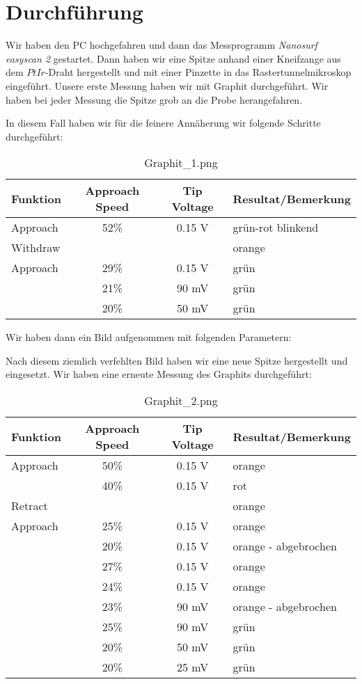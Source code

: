 \section{Durchführung}


Wir haben den PC hochgefahren und dann das Messprogramm \emph{Nanosurf easyscan 2} gestartet. Dann haben wir eine Spitze anhand einer Kneifzange aus dem $PtIr$-Draht hergestellt und mit einer Pinzette in das Rastertunnelmikroskop eingeführt. Unsere erste Messung haben wir mit Graphit durchgeführt. Wir haben bei jeder Messung die Spitze grob an die Probe herangefahren. 

In diesem Fall haben wir für die feinere Annäherung wir folgende Schritte durchgeführt:



\begin{table}[H]
\caption{Graphit\_1.png}
\centering \begin{tabular}[H]{l c c l}
Funktion & Approach Speed & Tip Voltage & Resultat/Bemerkung\\ \hline
Approach & 52\% & 0.15 V & grün-rot blinkend\\
Withdraw & & & orange\\
Approach & 29\% & 0.15 V & grün\\
 & 21\% & 90 mV & grün\\
 & 20\% & 50 mV & grün\\
\end{tabular}
\end{table}


Wir haben dann ein Bild aufgenommen mit folgenden Parametern:



Nach diesem ziemlich verfehlten Bild haben wir eine neue Spitze hergestellt und eingesetzt. Wir haben eine erneute Messung des Graphits durchgeführt: 

\begin{table}[H]
\caption{Graphit\_2.png}
\centering \begin{tabular}[H]{l c c l}
Funktion & Approach Speed & Tip Voltage & Resultat/Bemerkung\\ \hline
Approach & 50\% & 0.15 V & orange\\
 & 40\% & 0.15 V & rot\\
Retract & & & orange\\
Approach & 25\% & 0.15 V & orange\\
 & 20\% & 0.15 V & orange - abgebrochen\\
 & 27\% & 0.15 V & orange\\
 & 24\% & 0.15 V & orange\\
 & 23\% & 90 mV & orange - abgebrochen\\
 & 25\% & 90 mV & grün\\
 & 20\% & 50 mV & grün\\
 & 20\% & 25 mV & grün\\
\end{tabular}
\end{table}

